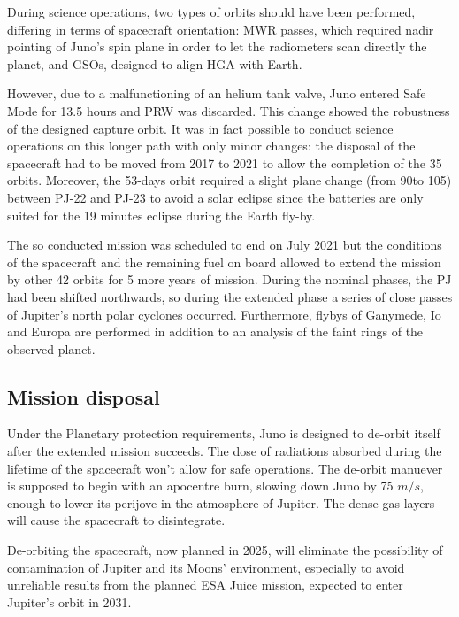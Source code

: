 During science operations, two types of orbits should have been performed, differing in terms of spacecraft orientation: MWR passes, which required nadir pointing of Juno's spin plane in order to let the radiometers scan directly the planet, and GSOs, designed to align HGA with Earth. 

However, due to a malfunctioning of an helium tank valve, Juno entered Safe Mode for 13.5 hours and PRW was discarded. This change showed the robustness of the designed capture orbit. It was in fact possible to conduct science operations on this longer path with only minor changes: the disposal of the spacecraft had to be moved from 2017 to 2021 to allow the completion of the 35 orbits. Moreover, the 53-days orbit required a slight plane change (from 90\textdegree to 105\textdegree) between PJ-22 and PJ-23 to avoid a solar eclipse since the batteries are only suited for the 19 minutes eclipse during the Earth fly-by. 

The so conducted mission was scheduled to end on July 2021 but the conditions of the spacecraft and the remaining fuel on board allowed to extend the mission by other 42 orbits for 5 more years of mission. During the nominal phases, the PJ had been shifted northwards, so during the extended phase a series of close passes of Jupiter's north polar cyclones occurred. Furthermore, flybys of Ganymede, Io and Europa are performed in addition to an analysis of the faint rings of the observed planet. \cite{fact_sheet}

\subsection{Mission disposal}
\label{sec: disposal}

Under the Planetary protection requirements, Juno is designed to de-orbit itself after the extended mission succeeds. The dose of radiations absorbed during the lifetime of the spacecraft won't allow for safe operations. The de-orbit manuever is supposed to begin with an apocentre burn, slowing down Juno by 75 $m/s$, enough to lower its perijove in the atmosphere of Jupiter. The dense gas layers will cause the spacecraft to disintegrate.

De-orbiting the spacecraft, now planned in 2025, will eliminate the possibility of contamination of Jupiter and its Moons' environment, especially to avoid unreliable results from the planned ESA Juice mission, expected to enter Jupiter's orbit in 2031. \cite{NASA1} \cite{NASA2}